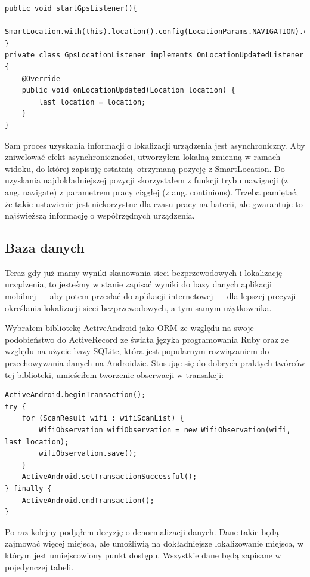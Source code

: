 \begin{verbatim}
public void startGpsListener(){
    SmartLocation.with(this).location().config(LocationParams.NAVIGATION).continuous().start(gps_location_listener);
}
private class GpsLocationListener implements OnLocationUpdatedListener {
    @Override
    public void onLocationUpdated(Location location) {
        last_location = location;
    }
}
\end{verbatim}

Sam proces uzyskania informacji o lokalizacji urządzenia jest asynchroniczny. Aby zniwelować efekt asynchroniczności, utworzyłem lokalną zmienną w ramach widoku, do której zapisuję ostatnią otrzymaną pozycję z SmartLocation. Do uzyskania najdokładniejszej pozycji skorzystałem z funkcji trybu nawigacji (z ang. navigate) z parametrem pracy ciągłej (z ang. continious). Trzeba pamiętać, że takie ustawienie jest niekorzystne dla czasu pracy na baterii, ale gwarantuje to najświeższą informację o współrzędnych urządzenia.

\subsection{Baza danych}
Teraz gdy już mamy wyniki skanowania sieci bezprzewodowych i lokalizację urządzenia, to jesteśmy w stanie zapisać wyniki do bazy danych aplikacji mobilnej — aby potem przesłać do aplikacji internetowej — dla lepszej precyzji określania lokalizacji sieci bezprzewodowych, a tym samym użytkownika.

Wybrałem bibliotekę ActiveAndroid jako ORM ze względu na swoje podobieństwo do ActiveRecord ze świata języka programowania Ruby oraz ze względu na użycie bazy SQLite, która jest popularnym rozwiązaniem do przechowywania danych na Androidzie. Stosując się do dobrych praktych twórców tej biblioteki, umieściłem tworzenie obserwacji w transakcji:

\begin{verbatim}
ActiveAndroid.beginTransaction();
try {
    for (ScanResult wifi : wifiScanList) {
        WifiObservation wifiObservation = new WifiObservation(wifi, last_location);
        wifiObservation.save();
    }
    ActiveAndroid.setTransactionSuccessful();
} finally {
    ActiveAndroid.endTransaction();
}
\end{verbatim}

Po raz kolejny podjąłem decyzję o denormalizacji danych. Dane takie będą zajmować więcej miejsca, ale umożliwią na dokładniejsze lokalizowanie miejsca, w którym jest umiejscowiony punkt dostępu. Wszystkie dane będą zapisane w pojedynczej tabeli.

